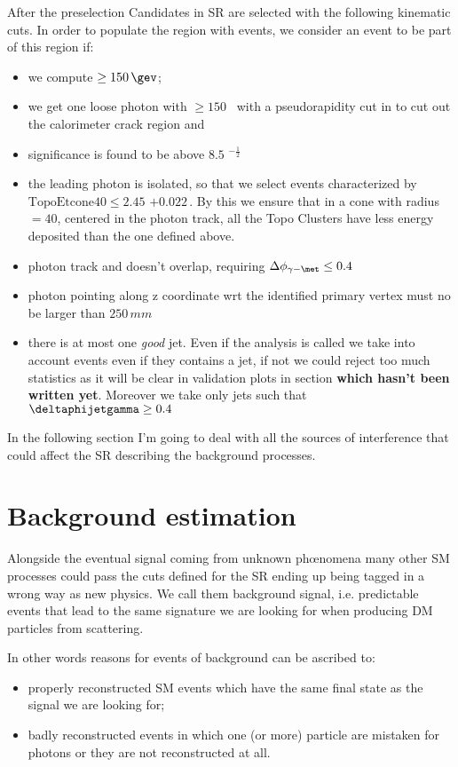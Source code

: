 After the preselection Candidates in SR are selected with the following kinematic cuts. In order to populate the region with \gmet events, we consider an event to be part of this region if:
\begin{itemize}
\item we compute \met $ \ge \SI{150}{\gev}$;
\item we get one loose photon with \pt $ \ge 150 $ \GeV $\,$ with a pseudorapidity cut in  to cut out the calorimeter crack region and 
\item \met significance is found to be above $8.5$ \GeV$^{-\frac{1}{2}}$
\item the leading photon is isolated, so that we select events characterized by $ \text{TopoEtcone40} \le 2.45$ \GeV$ + 0.022 \, $\pt \GeV. By this we ensure that in a cone with radius \DeltaRdef $ = 40$, centered in the photon track, all the Topo Clusters have less energy deposited than the one defined above.
\item photon track and \met doesn't overlap, requiring $\Delta\phi_{\gamma - \met} \le 0.4$
\item photon pointing along z coordinate wrt the identified primary vertex must no be larger than $250 \, mm$
\item there is at most one {\itshape good} jet. Even if the analysis is called \mph we take into account events even if they contains a jet, if not we could reject too much statistics as it will be clear in validation plots in section {\bfseries which hasn't been written yet}. Moreover we take only jets such that $\deltaphijetgamma \ge 0.4$

\end{itemize}

In the following section I'm going to deal with all the sources of interference that could affect the SR describing the background processes.

\section{Background estimation}
Alongside the eventual signal coming from unknown ph\oe nomena many other SM processes could pass the cuts defined for the SR ending up being tagged in a wrong way as new physics. We call them background signal, i.e. predictable events that lead to the same signature we are looking for when producing DM particles from \pp scattering.

In other words reasons for events of background can be ascribed to:
\begin{itemize}
\item properly reconstructed SM events which have the same final state as the signal we are looking for;
\item badly reconstructed events in which one (or more) particle are mistaken for photons or they are not reconstructed at all.
\end{itemize}

